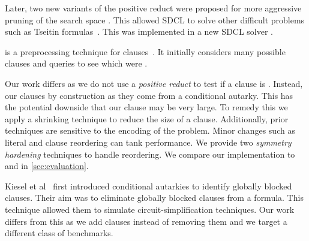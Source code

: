 Later, two new variants of the positive reduct were proposed for more aggressive pruning of the search space \cite{sadical}. This allowed SDCL to solve other difficult problems such as Tseitin formulas~\cite{hardexamplesresolution}. This was implemented in a new SDCL solver \sadical.


\prelearn is a preprocessing technique for \pr clauses~\cite{prelearn}. It initially considers many possible clauses and queries \sadical to see which were \pr.

Our work differs as we do not use a \emph{positive reduct} to test if a clause
is \pr. Instead, our clauses \pr by construction as they come from a conditional
autarky. This has the potential downside that our clause may be very large. To
remedy this we apply a shrinking technique to reduce the size of a clause.
Additionally, prior techniques are sensitive to the encoding of the problem.
Minor changes such as literal and clause reordering can tank performance. We
provide two \emph{symmetry hardening} techniques to handle reordering. We
compare our implementation \tool to \sadical and \prelearn in
\autoref{sec:evaluation}.

Kiesel et al~\cite{conditionalautarkies} first introduced conditional autarkies to identify globally blocked clauses. Their aim was to eliminate globally blocked clauses from a formula. This technique allowed them to simulate circuit-simplification techniques. Our work differs from this as we add clauses instead of removing them and we target a different class of benchmarks.

